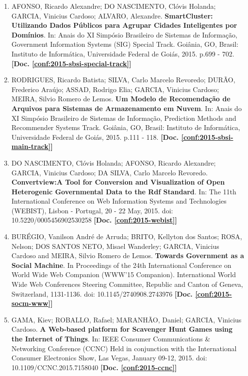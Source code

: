 \documentclass[a4paper,oneside,10pt]{article}
\begin{document}
\begin{enumerate}
\item AFONSO, Ricardo Alexandre; DO NASCIMENTO, Clóvis Holanda; GARCIA, Vinicius Cardoso; ALVARO, Alexandre. \textbf{SmartCluster: Utilizando Dados Públicos para Agrupar Cidades Inteligentes por Domínios}. In: Anais do XI Simpósio Brasileiro de Sistemas de Informação, Government Information Systems (SIG) Special Track. Goiânia, GO, Brasil: Instituto de Informática, Universidade Federal de Goiás, 2015. p.699 - 702. \textbf{[Doc. \ref{conf:2015-sbsi-special-track}]}

\item RODRIGUES, Ricardo Batista; SILVA, Carlo Marcelo Revoredo; DURÃO, Frederico Araújo; ASSAD, Rodrigo Elia; GARCIA, Vinicius Cardoso; MEIRA, Silvio Romero de Lemos. \textbf{Um Modelo de Recomendação de Arquivos para Sistemas de Armazenamento em Nuvem}. In: Anais do XI Simpósio Brasileiro de Sistemas de Informação, Prediction Methods and Recommender Systems Track. Goiânia, GO, Brasil: Instituto de Informática, Universidade Federal de Goiás, 2015. p.111 - 118. \textbf{[Doc. \ref{conf:2015-sbsi-main-track}]}

\item DO NASCIMENTO, Clóvis Holanda; AFONSO, Ricardo Alexandre; GARCIA, Vinicius Cardoso; DA SILVA, Carlo Marcelo Revoredo. \textbf{Convertview:A Tool for Conversion and Visualization of Open Heterogenic Governmental Data to the Rdf Standard}. In: The 11th International Conference on Web Information Systems and Technologies (WEBIST), Lisbon - Portugal, 20 - 22 May, 2015. doi: 10.5220/0005456902530258 \textbf{[Doc. \ref{conf:2015-webist}]}

\item BURÉGIO, Vanilson André de Arruda; BRITO, Kellyton dos Santos;  ROSA, Nelson; DOS SANTOS NETO, Misael Wanderley; GARCIA, Vinicius Cardoso and MEIRA, Silvio Romero de Lemos. \textbf{Towards Government as a Social Machine}. In Proceedings of the 24th International Conference on World Wide Web Companion (WWW'15 Companion). International World Wide Web Conferences Steering Committee, Republic and Canton of Geneva, Switzerland, 1131-1136. doi: 10.1145/2740908.2743976 \textbf{[Doc. \ref{conf:2015-socm-www}]}

\item GAMA, Kiev; ROBALLO, Rafael; MARANHÃO, Daniel; GARCIA, Vinicius Cardoso. \textbf{A Web-based platform for Scavenger Hunt Games using the Internet of Things}. In: IEEE Consumer Communications \& Networking Conference (CCNC) Held in conjunction with the International Consumer Electronics Show, Las Vegas, January 09-12, 2015. doi: 10.1109/CCNC.2015.7158040 \textbf{[Doc. \ref{conf:2015-ccnc}]}


\end{enumerate}
\end{document}
